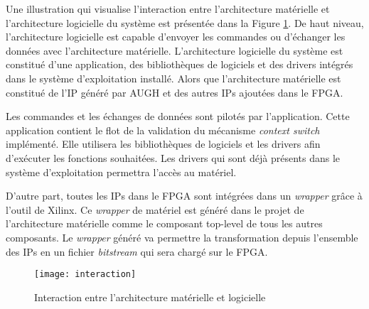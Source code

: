 Une illustration qui visualise l'interaction entre l'architecture matérielle 
et l'architecture logicielle du système est présentée dans la Figure \ref{fig:interaction}.
De haut niveau, l'architecture logicielle est capable d'envoyer les commandes ou
d'échanger les données avec l'architecture matérielle.
L'architecture logicielle du système est constitué d'une application, des bibliothèques de logiciels et des drivers
intégrés dans le système d'exploitation installé. Alors que l'architecture matérielle
est constitué de l'IP généré par AUGH et des autres IPs ajoutées dans le FPGA.

Les commandes et les échanges de données sont pilotés par l'application. Cette application
contient le flot de la validation du mécanisme \emph{context switch} implémenté.
Elle utilisera les bibliothèques de logiciels et les drivers afin d'exécuter les fonctions souhaitées.
Les drivers qui sont déjà présents dans le système d'exploitation permettra l'accès au
matériel.

D'autre part, toutes les IPs dans le FPGA sont intégrées dans un \emph{wrapper} grâce
à l'outil de Xilinx. Ce \emph{wrapper} de matériel est généré dans le projet de l'architecture matérielle
comme le composant \og top-level \fg de tous les autres composants.
Le \emph{wrapper} généré va permettre la transformation depuis l'ensemble des IPs en un fichier \emph{bitstream} qui sera
chargé sur le FPGA.

\begin{figure}[h]
	\centering
	\texttt{[image: interaction]}
	\caption{Interaction entre l'architecture matérielle et logicielle}
	\label{fig:interaction}
	\vspace{-2mm}
\end{figure}